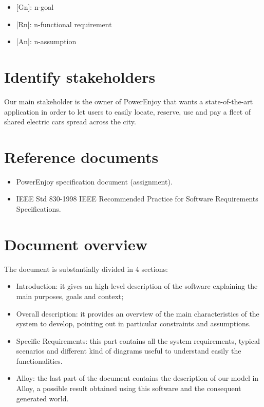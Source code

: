 \begin{itemize}
\item {[Gn]}: n-goal
\item {[Rn]}: n-functional requirement
\item {[An]}: n-assumption
\end{itemize}

\section{Identify stakeholders}

Our main stakeholder is the owner of PowerEnjoy that wants a state-of-the-art application in order to let users to easily locate, reserve, use and pay a fleet of shared electric cars spread across the city.

\section{Reference documents}

\begin{itemize}
\item PowerEnjoy specification document (assignment).
\item IEEE Std 830-1998 IEEE Recommended Practice for Software Requirements Specifications.
\end{itemize}
\section{Document overview}
The document is substantially divided in 4 sections:
\begin{itemize}
\item Introduction: it gives an high-level description of the software explaining the main purposes, goals and context;
\item Overall description: it provides an overview of the main characteristics of the system to develop, pointing out in particular constraints and assumptions.
\item Specific Requirements: this part contains all the system requirements, typical scenarios and different kind of diagrams useful to understand easily the functionalities.
\item Alloy: the last part of the document contains the description of our model in Alloy, a possible result obtained using this software and the consequent generated world.
\end{itemize}
